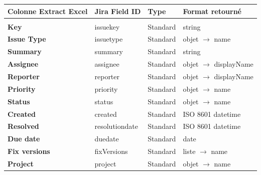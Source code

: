 \documentclass[12pt, a4paper]{article}
\begin{document}
\begin{longtable}{>{\bfseries\small}p{4.8cm}
                  >{\ttfamily\small}p{4.8cm}
                  >{\small}p{2.2cm}
                  >{\small}p{2.4cm}}
  \toprule
  \normalfont\textbf{Colonne Extract Excel} &
  \normalfont\textbf{Jira Field ID} &
  \normalfont\textbf{Type} &
  \normalfont\textbf{Format retourné} \\
  \midrule
  \endhead
  \bottomrule
  \endfoot

  \multicolumn{4}{l}{\textit{\color{dxcpurple}Champs standard}} \\[3pt]
  Key                        & issuekey              & Standard & string \\
  Issue Type                 & issuetype             & Standard & objet $\to$ name \\
  Summary                    & summary               & Standard & string \\
  Assignee                   & assignee              & Standard & objet $\to$ displayName \\
  Reporter                   & reporter              & Standard & objet $\to$ displayName \\
  Priority                   & priority              & Standard & objet $\to$ name \\
  Status                     & status                & Standard & objet $\to$ name \\
  Created                    & created               & Standard & ISO 8601 datetime \\
  Resolved                   & resolutiondate        & Standard & ISO 8601 datetime \\
  Due date                   & duedate               & Standard & date \\
  Fix versions               & fixVersions           & Standard & liste $\to$ name \\
  Project                    & project               & Standard & objet $\to$ name \\[6pt]


\end{longtable}
\end{document}
